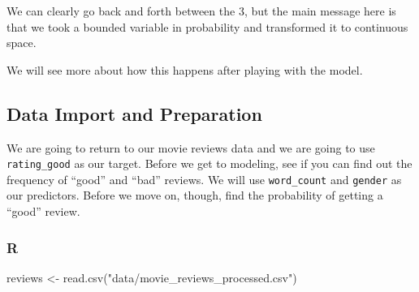 \documentclass[
  letterpaper,
]{krantz}
\newenvironment{Shaded}{}{}
\newcommand{\DecValTok}[1]{\textcolor[rgb]{0.25,0.63,0.44}{#1}}
\newcommand{\FunctionTok}[1]{\textcolor[rgb]{0.02,0.16,0.49}{#1}}
\newcommand{\NormalTok}[1]{#1}
\newcommand{\OtherTok}[1]{\textcolor[rgb]{0.00,0.44,0.13}{#1}}
\newcommand{\SpecialCharTok}[1]{\textcolor[rgb]{0.25,0.44,0.63}{#1}}
\newcommand{\StringTok}[1]{\textcolor[rgb]{0.25,0.44,0.63}{#1}}
\begin{document}
We can clearly go back and forth between the 3, but the main message
here is that we took a bounded variable in probability and transformed
it to continuous space.

We will see more about how this happens after playing with the model.

\subsection{Data Import and
Preparation}\label{data-import-and-preparation}

We are going to return to our movie reviews data and we are going to use
\texttt{rating\_good} as our target. Before we get to modeling, see if
you can find out the frequency of ``good'' and ``bad'' reviews. We will
use \texttt{word\_count} and \texttt{gender} as our predictors. Before
we move on, though, find the probability of getting a ``good'' review.

\subsubsection{R}

\begin{Shaded}
\begin{Highlighting}[]
\NormalTok{reviews }\OtherTok{\textless{}{-}} \FunctionTok{read.csv}\NormalTok{(}\StringTok{"data/movie\_reviews\_processed.csv"}\NormalTok{)}
\end{Highlighting}
\end{Shaded}

\begin{Shaded}
\end{Shaded}
\end{document}
